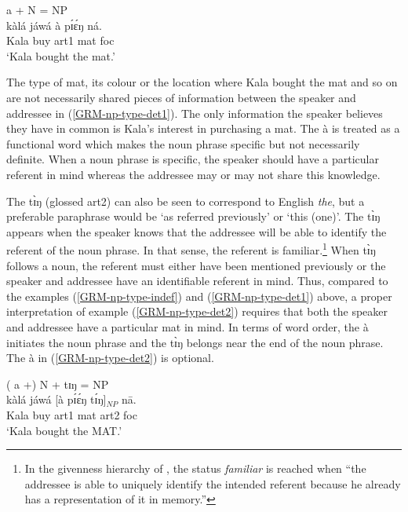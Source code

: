 \begin{exe}
\begin{exe}
\begin{exe}
\begin{exe}
\begin{exe}
 \ea\label{GRM-np-type-det1}{\rm  a + N = NP}\\
\gll  kàlá jáwá  à pɪ́ɛ́ŋ ná.\\
  Kala buy {\sc art1}  mat {\sc foc}\\
\glt  `Kala bought the mat.' 
\z


The type of mat,  its colour or the location where Kala bought the mat and so on
are not necessarily shared pieces of information between the speaker and 
addressee
in (\ref{GRM-np-type-det1}).  The only information the speaker believes they
have in common is Kala's interest in purchasing a mat. The  {\sls à} is 
treated as a functional word which makes the noun phrase specific but not
necessarily
definite.  When a noun phrase is  specific, the speaker should have a particular
referent in mind whereas the addressee may or may not share this knowledge.


The  {\sls tɪ̀ŋ}  (glossed {\sc art2}) can also be seen to correspond to
English {\it the},  but a preferable paraphrase would be `as referred previously' or
 `this (one)'.  The  {\sls  tɪ̀ŋ} appears when the speaker knows that the
addressee will be able to identify the referent of the noun phrase. In that 
sense,
the referent is familiar.\footnote{In the givenness hierarchy of
\citet[278]{Gund93}, the status {\it familiar} is reached when ``the addressee
is able to uniquely identify the intended referent because he already has a
representation of it in memory.''}   When {\sls tɪ̀ŋ} follows a noun, the 
referent
must either have been mentioned previously or the speaker and addressee have an
identifiable referent in mind. Thus, compared to the examples
(\ref{GRM-np-type-indef}) and (\ref{GRM-np-type-det1}) above, a proper
interpretation of example (\ref{GRM-np-type-det2}) requires that both the
speaker and addressee have a particular mat in mind. In terms of word order, the
  {\sls à}  initiates the noun phrase and  the  {\sls tɪ̀ŋ}  
belongs
near the end of the noun phrase. The   {\sls à}  in (\ref{GRM-np-type-det2}) is optional.
 

\begin{exe}
 \ex\label{GRM-np-type-det2}{\rm   ( {\sls a} +) N +  {\sls tɪŋ} = NP}\\
\gll  kàlá jáwá  [à pɪ́ɛ́ŋ  tɪ́ŋ]$_{NP}$ nā.\\
  Kala buy {\sc art1}  mat {\sc art2} {\sc foc}\\
\glt  `Kala bought the MAT.'
\z


\end{exe}
\end{exe}
\end{exe}
\end{exe}
\end{exe}
\end{exe}
